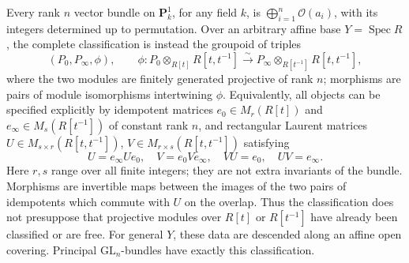 \begin{theorem}
\label{geo-Kh}
Every rank $n$ vector bundle on $\mathbf P^1_k$, for any field $k$, is
$\bigoplus_{i=1}^n\mathcal O(a_i)$, with its integers determined up to
permutation. Over an arbitrary affine base $Y=\operatorname{Spec}R$,
the complete classification is instead the groupoid of triples
\[
 (P_0,P_\infty,\phi),\qquad
 \phi:P_0\otimes_{R[t]}R[t,t^{-1}]
 \xrightarrow{\sim}P_\infty\otimes_{R[t^{-1}]}R[t,t^{-1}],
\]
where the two modules are finitely generated projective of rank $n$;
morphisms are pairs of module isomorphisms intertwining $\phi$.
Equivalently, all objects can be specified explicitly by idempotent
matrices $e_0\in M_r(R[t])$ and $e_\infty\in M_s(R[t^{-1}])$ of
constant rank $n$, and rectangular Laurent matrices
$U\in M_{s\times r}(R[t,t^{-1}])$, $V\in M_{r\times s}(R[t,t^{-1}])$
satisfying
\[
 U=e_\infty Ue_0,\quad V=e_0Ve_\infty,\quad
 VU=e_0,\quad UV=e_\infty.
\]
Here $r,s$ range over all finite integers; they are not extra invariants
of the bundle. Morphisms are invertible maps between the images of the
two pairs of idempotents which commute with $U$ on the overlap. Thus
the classification does not presuppose that projective modules over
$R[t]$ or $R[t^{-1}]$ have already been classified or are free.
For general $Y$, these data are descended along an affine open covering.
Principal $\mathrm{GL}_n$-bundles have exactly this classification.
\end{theorem}
